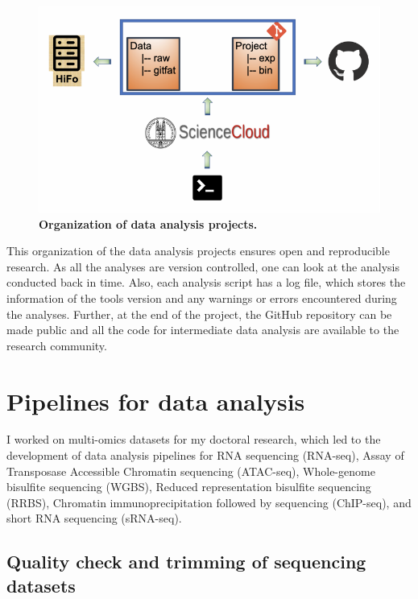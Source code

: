 \documentclass[12pt,twoside]{reedthesis}
\begin{document}
\begin{figure}[H]

{\centering \includegraphics{thesis_files/figure-latex/mf2-1} 

}

\caption[Organization of data analysis projects]{\textbf{Organization of data analysis projects.}}\label{fig:mf2}
\end{figure}
This organization of the data analysis projects ensures open and
reproducible research. As all the analyses are version controlled, one
can look at the analysis conducted back in time. Also, each analysis
script has a log file, which stores the information of the tools version
and any warnings or errors encountered during the analyses. Further, at
the end of the project, the GitHub repository can be made public and all
the code for intermediate data analysis are available to the research
community.

\hypertarget{m3}{%
\section*{Pipelines for data analysis}\label{m3}}

I worked on multi-omics datasets for my doctoral research, which led to
the development of data analysis pipelines for RNA sequencing (RNA-seq),
Assay of Transposase Accessible Chromatin sequencing (ATAC-seq),
Whole-genome bisulfite sequencing (WGBS), Reduced
representation bisulfite sequencing (RRBS), Chromatin
immunoprecipitation followed by sequencing (ChIP-seq), and short RNA
sequencing (sRNA-seq).

\hypertarget{m3.1}{%
\subsection*{Quality check and trimming of sequencing datasets}\label{m3.1}}
\end{document}
